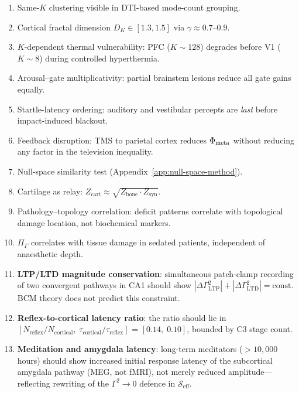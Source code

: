 \documentclass[aps,pre,twocolumn,superscriptaddress,floatfix]{revtex4-2}
\begin{document}
\begin{enumerate}
  \item Same-$K$ clustering visible in DTI-based
    mode-count grouping.
  \item Cortical fractal dimension
    $D_K \in [1.3, 1.5]$ via $\gamma \approx 0.7$--$0.9$.
  \item $K$-dependent thermal vulnerability:
    PFC ($K\sim 128$) degrades before V1 ($K\sim 8$)
    during controlled hyperthermia.
  \item Arousal--gate multiplicativity:
    partial brainstem lesions reduce all gate gains equally.
  \item Startle-latency ordering:
    auditory and vestibular percepts are \emph{last}
    before impact-induced blackout.
  \item Feedback disruption:
    TMS to parietal cortex reduces $\Phi_{\text{meta}}$ without
    reducing any factor in the television inequality.
  \item Null-space similarity test
    (Appendix~\ref{app:null-space-method}).
  \item Cartilage as relay:
    $Z_{\text{cart}} \approx
    \sqrt{Z_{\text{bone}} \cdot Z_{\text{syn}}}$.
  \item Pathology--topology correlation:
    deficit patterns correlate with topological damage
    location, not biochemical markers.
  \item $\Pi_{\Gamma}$ correlates with tissue damage
    in sedated patients, independent of anaesthetic depth.
  \item \textbf{LTP/LTD magnitude conservation}:
    simultaneous patch-clamp recording of two convergent
    pathways in CA1 should show
    $|\Delta\Gamma^2_{\text{LTP}}|
    + |\Delta\Gamma^2_{\text{LTD}}| = \text{const}$.
    BCM theory does not predict this constraint.
  \item \textbf{Reflex-to-cortical latency ratio}:
    the ratio should lie in $[N_{\text{reflex}}/
    N_{\text{cortical}},\;
    \tau_{\text{cortical}}/\tau_{\text{reflex}}]$
    = $[0.14,\; 0.10]$, bounded by C3 stage count.
  \item \textbf{Meditation and amygdala latency}:
    long-term meditators ($>10{,}000$\,hours) should show
    increased initial response latency of the subcortical
    amygdala pathway (MEG, not fMRI), not merely
    reduced amplitude---reflecting rewriting of the
    $\Gamma^2 \to 0$ defence in
    $\mathcal{S}_{\text{eff}}$.
\end{enumerate}
\end{document}
